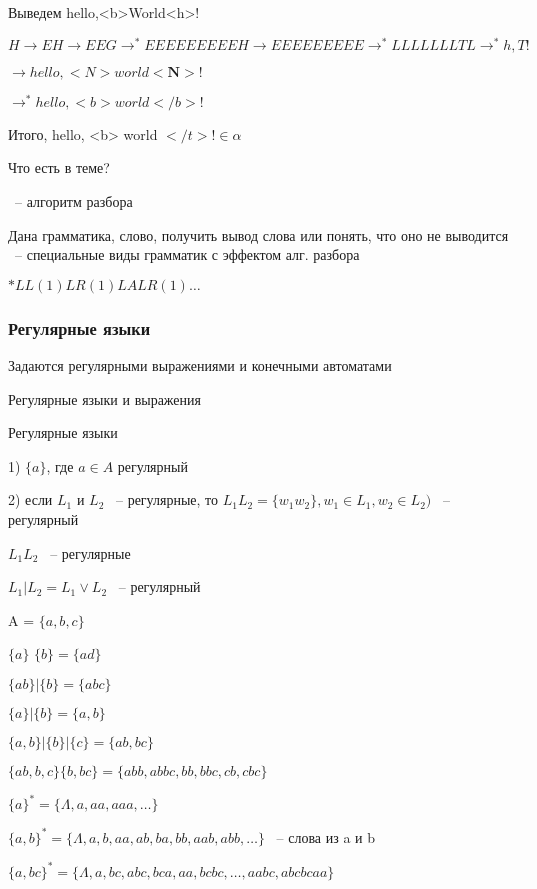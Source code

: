 \documentclass[russian]{lecture-notes}
\begin{document}
	Выведем hello,<b>World<h>!

	$H \rightarrow EH \rightarrow EEG \rightarrow^{*} EEEEEEEEEH \rightarrow EEEEEEEEE \rightarrow^{*} LLLLLLLTL \rightarrow^{*} h,T!$

	$\rightarrow hello, <N> world <\mathbf{N}>!$

	$\rightarrow^{*} hello, <b> world </b>!$

	Итого, hello, <b> world $</t>! \in \alpha$

	Что есть в теме?

	~-- алгоритм разбора

		Дана грамматика, слово, получить вывод слова или понять, что оно не выводится ~-- специальные виды грамматик с эффектом алг. разбора

	$*LL(1) LR(1) LALR(1) \dots$

	\subsubsection{Регулярные языки}

	Задаются регулярными выражениями и конечными автоматами

	Регулярные языки и выражения

	\begin{definition}

		Регулярные языки

		1) $\{a\}$, где $a \in A$ регулярный

		2) если $L_{1}$ и $L_{2}$ ~-- регулярные, то $L_{1}L_{2} = \{w_{1}w_{2}\}, w_{1} \in L_{1}, w_{2} \in L_{2})$ ~-- регулярный

		$L_{1}L_{2}$ ~-- регулярные

		$L_{1}|L_{2} = L_{1} \lor L_{2}$ ~-- регулярный

		\end{definition}

	\begin{example}

		A = $\{a,b,c\}$

		$\{a\}$ \qquad $\{b\} = \{ad\}$

		$\{ab\}|\{b\}=\{abc\}$

		$\{a\}|\{b\} = \{a,b\}$

		$\{a,b\}|\{b\}|\{c\} = \{ab,bc\}$

		$\{ab,b,c\}\{b,bc\} = \{abb,abbc,bb,bbc,cb,cbc\}$

		$\{a\}^{*} = \{\Lambda,a,aa,aaa,\dots \} $

		$\{a,b\}^{*} = \{\Lambda,a,b,aa,ab,ba,bb,aab,abb,\dots \}$ ~-- слова из a и b

		$\{a,bc\}^{*} = \{\Lambda,a,bc,abc,bca,aa,bcbc,\dots,aabc,abcbcaa \}$

		\end{example}
\end{document}
